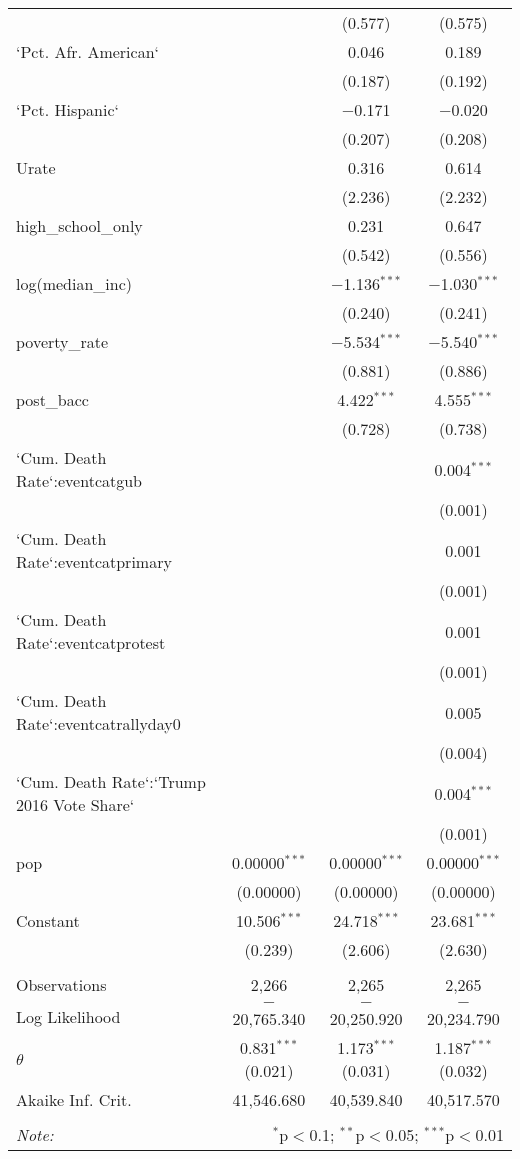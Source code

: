 \begin{table}[!htbp]
\begin{tabular}{@{\extracolsep{5pt}}lccc}
  &  & (0.577) & (0.575) \\ 
  `Pct. Afr. American` &  & 0.046 & 0.189 \\ 
  &  & (0.187) & (0.192) \\ 
  `Pct. Hispanic` &  & $-$0.171 & $-$0.020 \\ 
  &  & (0.207) & (0.208) \\ 
  Urate &  & 0.316 & 0.614 \\ 
  &  & (2.236) & (2.232) \\ 
  high\_school\_only &  & 0.231 & 0.647 \\ 
  &  & (0.542) & (0.556) \\ 
  log(median\_inc) &  & $-$1.136$^{***}$ & $-$1.030$^{***}$ \\ 
  &  & (0.240) & (0.241) \\ 
  poverty\_rate &  & $-$5.534$^{***}$ & $-$5.540$^{***}$ \\ 
  &  & (0.881) & (0.886) \\ 
  post\_bacc &  & 4.422$^{***}$ & 4.555$^{***}$ \\ 
  &  & (0.728) & (0.738) \\ 
  `Cum. Death Rate`:eventcatgub &  &  & 0.004$^{***}$ \\ 
  &  &  & (0.001) \\ 
  `Cum. Death Rate`:eventcatprimary &  &  & 0.001 \\ 
  &  &  & (0.001) \\ 
  `Cum. Death Rate`:eventcatprotest &  &  & 0.001 \\ 
  &  &  & (0.001) \\ 
  `Cum. Death Rate`:eventcatrallyday0 &  &  & 0.005 \\ 
  &  &  & (0.004) \\ 
  `Cum. Death Rate`:`Trump 2016 Vote Share` &  &  & 0.004$^{***}$ \\ 
  &  &  & (0.001) \\ 
  pop & 0.00000$^{***}$ & 0.00000$^{***}$ & 0.00000$^{***}$ \\ 
  & (0.00000) & (0.00000) & (0.00000) \\ 
  Constant & 10.506$^{***}$ & 24.718$^{***}$ & 23.681$^{***}$ \\ 
  & (0.239) & (2.606) & (2.630) \\ 
 \hline \\[-1.8ex] 
Observations & 2,266 & 2,265 & 2,265 \\ 
Log Likelihood & $-$20,765.340 & $-$20,250.920 & $-$20,234.790 \\ 
$\theta$ & 0.831$^{***}$  (0.021) & 1.173$^{***}$  (0.031) & 1.187$^{***}$  (0.032) \\ 
Akaike Inf. Crit. & 41,546.680 & 40,539.840 & 40,517.570 \\ 
\hline 
\hline \\[-1.8ex] 
\textit{Note:}  & \multicolumn{3}{r}{$^{*}$p$<$0.1; $^{**}$p$<$0.05; $^{***}$p$<$0.01} \\ 
\end{tabular} 
\end{table} 
